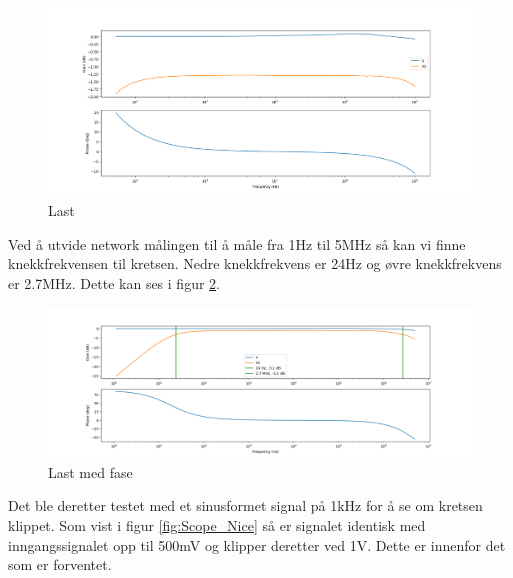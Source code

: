 \begin{figure}[H]
\centering
\includegraphics[scale=0.4]{bilder/Bodeplot+Pase_Third.png}
\caption{Last}
\label{fig:Third}
\end{figure}

Ved å utvide network målingen til å måle fra 1Hz til 5MHz så kan vi finne knekkfrekvensen til kretsen. Nedre knekkfrekvens er 24Hz og øvre knekkfrekvens er 2.7MHz. Dette kan ses i figur \ref{fig:Last+Pase}.

\begin{figure}[H]
\centering
\includegraphics[scale=0.4]{bilder/Bodeplot+Pase_Last.png}
\caption{Last med fase}
\label{fig:Last+Pase}
\end{figure}


Det ble deretter testet med et sinusformet signal på 1kHz for å se om kretsen klippet. Som vist i figur \ref{fig:Scope_Nice} så er signalet identisk med inngangssignalet opp til 500mV og klipper deretter ved 1V. Dette er innenfor det som er forventet.

